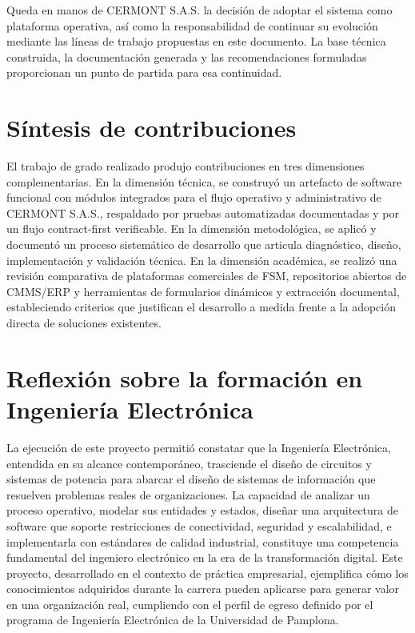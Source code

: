 Queda en manos de CERMONT S.A.S. la decisión de adoptar el sistema como plataforma operativa, así como la responsabilidad de continuar su evolución mediante las líneas de trabajo propuestas en este documento. La base técnica construida, la documentación generada y las recomendaciones formuladas proporcionan un punto de partida para esa continuidad.

\section{Síntesis de contribuciones}
\label{sec:sintesis-contribuciones}

El trabajo de grado realizado produjo contribuciones en tres dimensiones complementarias. En la dimensión técnica, se construyó un artefacto de software funcional con módulos integrados para el flujo operativo y administrativo de CERMONT S.A.S., respaldado por pruebas automatizadas documentadas y por un flujo contract-first verificable. En la dimensión metodológica, se aplicó y documentó un proceso sistemático de desarrollo que articula diagnóstico, diseño, implementación y validación técnica. En la dimensión académica, se realizó una revisión comparativa de plataformas comerciales de FSM, repositorios abiertos de CMMS/ERP y herramientas de formularios dinámicos y extracción documental, estableciendo criterios que justifican el desarrollo a medida frente a la adopción directa de soluciones existentes.

\section{Reflexión sobre la formación en Ingeniería Electrónica}
\label{sec:reflexion-ie}

La ejecución de este proyecto permitió constatar que la Ingeniería Electrónica, entendida en su alcance contemporáneo, trasciende el diseño de circuitos y sistemas de potencia para abarcar el diseño de sistemas de información que resuelven problemas reales de organizaciones. La capacidad de analizar un proceso operativo, modelar sus entidades y estados, diseñar una arquitectura de software que soporte restricciones de conectividad, seguridad y escalabilidad, e implementarla con estándares de calidad industrial, constituye una competencia fundamental del ingeniero electrónico en la era de la transformación digital. Este proyecto, desarrollado en el contexto de práctica empresarial, ejemplifica cómo los conocimientos adquiridos durante la carrera pueden aplicarse para generar valor en una organización real, cumpliendo con el perfil de egreso definido por el programa de Ingeniería Electrónica de la Universidad de Pamplona.

